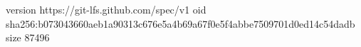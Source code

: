 version https://git-lfs.github.com/spec/v1
oid sha256:b073043660aeb1a90313c676e5a4b69a67f0e5f4abbe7509701d0ed14c54dadb
size 87496
